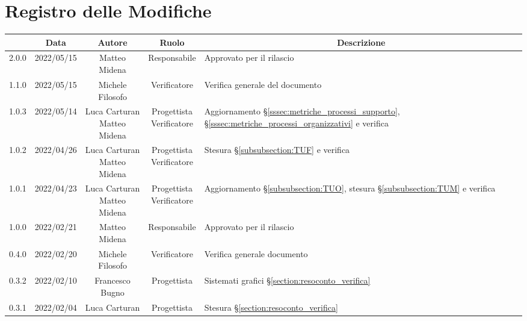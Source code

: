 \thispagestyle{empty}
\section*{Registro delle Modifiche}

\begin{center}
	\renewcommand{\arraystretch}{1.8}
	\begin{longtable}[c]{c | c | c | c | p{5cm}}
		\rowcolor[HTML]{125E28}
		\multicolumn{1}{c}{\color[HTML]{FFFFFF} \textbf{Versione}} & 
		\multicolumn{1}{c}{\color[HTML]{FFFFFF} \textbf{Data}} & 
		\multicolumn{1}{c}{\color[HTML]{FFFFFF} \textbf{Autore}} & 
		\multicolumn{1}{c}{\color[HTML]{FFFFFF} \textbf{Ruolo}} & 
		\multicolumn{1}{c}{\color[HTML]{FFFFFF} \textbf{Descrizione}} \\
		\endhead
		2.0.0 & 2022/05/15 & Matteo Midena & Responsabile & Approvato per il rilascio\\
		1.1.0 & 2022/05/15 & Michele Filosofo & Verificatore & Verifica generale del documento\\
		1.0.3 & 2022/05/14 & \Longunderstack{Luca Carturan\\Matteo Midena} & \Longunderstack{Progettista\\Verificatore} & Aggiornamento §\ref{sssec:metriche_processi_supporto}, §\ref{sssec:metriche_processi_organizzativi} e verifica\\
		1.0.2 & 2022/04/26 & \Longunderstack{Luca Carturan\\Matteo Midena} & \Longunderstack{Progettista\\Verificatore} & Stesura §\ref{subsubsection:TUF} e verifica\\
		1.0.1 & 2022/04/23 & \Longunderstack{Luca Carturan\\Matteo Midena} & \Longunderstack{Progettista\\Verificatore} & Aggiornamento §\ref{subsubsection:TUO}, stesura §\ref{subsubsection:TUM} e verifica\\
		1.0.0 & 2022/02/21 & Matteo Midena & Responsabile & Approvato per il rilascio\\
		0.4.0 & 2022/02/20 & Michele Filosofo & Verificatore & Verifica generale documento\\
		0.3.2 & 2022/02/10 & Francesco Bugno & Progettista & Sistemati grafici §\ref{section:resoconto_verifica}\\
		0.3.1 & 2022/02/04 & Luca Carturan & Progettista & Stesura §\ref{section:resoconto_verifica}\\

\end{longtable}
\end{center}
